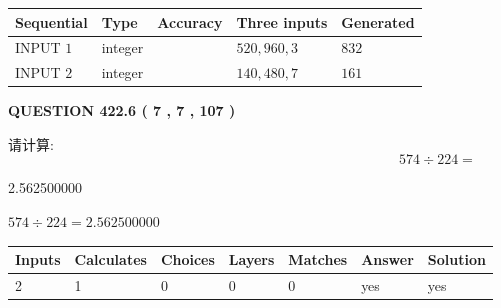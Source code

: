 \documentclass{ctexart}
\begin{document}
  
\noindent\begin{tabular}{|l|l|l|l|l|}
\hline
 Sequential & Type & Accuracy & Three inputs & Generated \\ 
\hline
 
 
  INPUT $  1 $ & integer &  & $
 520
 , 
 960
 , 
 3
 $ & $ 832 $ 
 \\  \hline  
 
 
  INPUT $  2 $ & integer &  & $
 140
 , 
 480
 , 
 7
 $ & $ 161 $ 
 \\  \hline  
 \end{tabular}
   
   
  
\vspace{0.2in}
  
{\textbf{\Large{QUESTION
422.6 
 ( 7 , 7 , 107 )
}}}
  
  
 
请计算:
\begin{equation}
574  \div    %
224 = \nonumber
\end{equation}
 
 
 
\noindent{}
 
 

2.562500000
 
 
\noindent{}
 
 

 
 
 
\noindent{}
 
 

$ %
574 \div  %
224=   %
2.562500000$
 
 
\noindent{}
 
 

 
   
   
   
   
\noindent\begin{tabular}{|l|l|l|l|l|l|l|}
 \hline
Inputs & Calculates & Choices & Layers & Matches & Answer & Solution \\ \hline
 2  & 
 1  & 
 0
  & 
 0  & 
 0  & 
  yes & 
  yes 
  \\ \hline
 \end{tabular}
   
\end{document}
